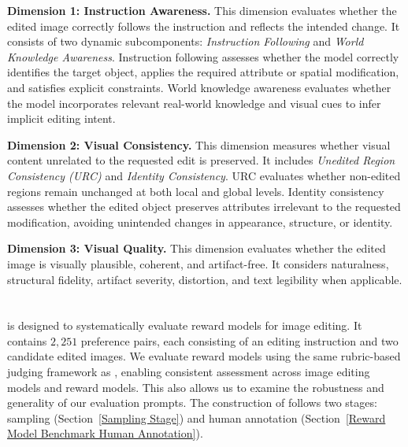 \textbf{Dimension 1: Instruction Awareness.}
This dimension evaluates whether the edited image correctly follows the instruction and reflects the intended change. It consists of two dynamic subcomponents: \textit{Instruction Following} and \textit{World Knowledge Awareness}. Instruction following assesses whether the model correctly identifies the target object, applies the required attribute or spatial modification, and satisfies explicit constraints. World knowledge awareness evaluates whether the model incorporates relevant real-world knowledge and visual cues to infer implicit editing intent.

\textbf{Dimension 2: Visual Consistency.}
This dimension measures whether visual content unrelated to the requested edit is preserved. It includes \textit{Unedited Region Consistency (URC)} and \textit{Identity Consistency}. URC evaluates whether non-edited regions remain unchanged at both local and global levels. Identity consistency assesses whether the edited object preserves attributes irrelevant to the requested modification, avoiding unintended changes in appearance, structure, or identity.

\textbf{Dimension 3: Visual Quality.}
This dimension evaluates whether the edited image is visually plausible, coherent, and artifact-free. It considers naturalness, structural fidelity, artifact severity, distortion, and text legibility when applicable.




\section{\rmbench}
{\rmbench} is designed to systematically evaluate reward models for image editing. It contains $2,251$ preference pairs, each consisting of an editing instruction and two candidate edited images. We evaluate reward models using the same rubric-based judging framework as {\bench}, enabling consistent assessment across image editing models and reward models. This also allows us to examine the robustness and generality of our evaluation prompts. The construction of {\rmbench} follows two stages: sampling (Section~\ref{Sampling Stage}) and human annotation (Section~\ref{Reward Model Benchmark Human Annotation}).



